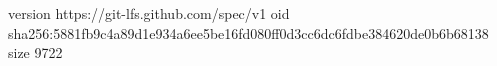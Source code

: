 version https://git-lfs.github.com/spec/v1
oid sha256:5881fb9c4a89d1e934a6ee5be16fd080ff0d3cc6dc6fdbe384620de0b6b68138
size 9722
